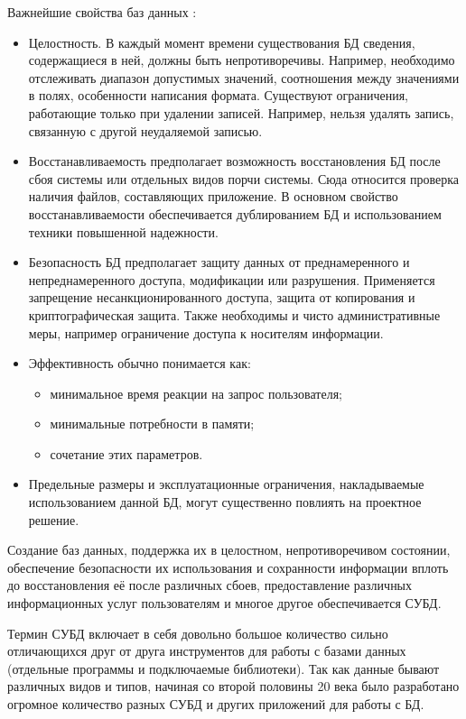 Важнейшие свойства баз данных \cite{sql2}:
\begin{itemize}
\item Целостность. В каждый момент времени существования БД сведения, содержащиеся в ней, должны быть непротиворечивы. Например, необходимо отслеживать диапазон допустимых значений, соотношения между значениями в полях, особенности написания формата. Существуют ограничения, работающие только при удалении записей. Например, нельзя удалять запись, связанную с другой неудаляемой записью.
\item Восстанавливаемость предполагает возможность восстановления БД после сбоя системы или отдельных видов порчи системы. Сюда относится проверка наличия файлов, составляющих приложение. В основном свойство восстанавливаемости обеспечивается дублированием БД и использованием техники повышенной надежности.
\item Безопасность БД предполагает защиту данных от преднамеренного и непреднамеренного доступа, модификации или разрушения. Применяется запрещение несанкционированного доступа, защита от копирования и криптографическая защита. Также необходимы и чисто административные меры, например ограничение доступа к носителям информации. 
\item Эффективность обычно понимается как:
\begin{itemize}
\item  минимальное время реакции на запрос пользователя;
\item  минимальные потребности в памяти;
\item  сочетание этих параметров.
\end{itemize}
\item Предельные размеры и эксплуатационные ограничения, накладываемые использованием данной БД, могут существенно повлиять на проектное решение.
\end{itemize}
Создание баз данных, поддержка их в целостном, непротиворечивом состоянии, обеспечение безопасности их использования и сохранности информации вплоть до восстановления её после различных сбоев, предоставление различных информационных услуг пользователям и многое другое обеспечивается СУБД.

Термин СУБД включает в себя довольно большое количество сильно отличающихся друг от друга инструментов для работы с базами данных (отдельные программы и подключаемые библиотеки). Так как данные бывают различных видов и типов, начиная со второй половины 20 века было разработано огромное количество разных СУБД и других приложений для работы с БД.

